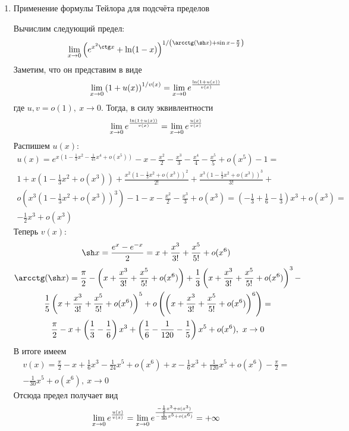 \begin{enumerate}
	\item Применение формулы Тейлора для подсчёта пределов
	\begin{example}
		Вычислим следующий предел:
		\[
			\liml_{x \to 0} \left(e^{x^2 \ctg x} + \ln(1 - x)\right)^{1 / \left(\arcctg (\sh x) + \sin x - \frac{\pi}{2}\right)}
		\]
		Заметим, что он представим в виде
		\[
			\lim\limits_{x \to 0} \left(1 + u(x)\right)^{1 / v(x)} = \lim\limits_{x \to 0} e^{ \frac{\ln (1 + u(x))}{v(x)}}
		\]
		где $u, v = o(1),\ x \to 0$. Тогда, в силу эквивлентности
		\[
			\lim\limits_{x \to 0} e^{ \frac{\ln (1 + u(x))}{v(x)}} = \lim\limits_{x \to 0} e^{\frac{u(x)}{v(x)}}
		\]
		Распишем $u(x)$:
		\begin{multline*}
			u(x) = e^{x\left(1 - \frac{1}{3}x^2 - \frac{1}{45}x^4 + o(x^5)\right)} - x - \frac{x^2}{2} - \frac{x^3}{3} - \frac{x^4}{4} - \frac{x^5}{5} + o(x^5) - 1 =
			\\
			1 + x\left(1 - \frac{1}{3}x^2 + o(x^3)\right) + \frac{x^2\left(1 - \frac{1}{3}x^2 + o(x^3)\right)^2}{2!} + \frac{x^3\left(1 - \frac{1}{3}x^2 + o(x^3)\right)^3}{3!} + 
			\\
			o\left(x^3\left(1 - \frac{1}{3}x^2 + o(x^3)\right)^3\right) - 1 - x - \frac{x^2}{2} - \frac{x^3}{3} + o(x^3) = \left(-\frac{1}{3} + \frac{1}{6} - \frac{1}{3}\right)x^3 + o(x^3) = 
			\\
			-\frac{1}{2}x^3 + o(x^3)
		\end{multline*}
		Теперь $v(x)$:
		\[
			\sh x = \frac{e^x - e^{-x}}{2} = x + \frac{x^3}{3!} + \frac{x^5}{5!} + o(x^6)
		\]
		\begin{multline*}
			\arcctg(\sh x) = \frac{\pi}{2} - \left(x + \frac{x^3}{3!} + \frac{x^5}{5!} + o(x^6)\right) + \frac{1}{3}\left(x + \frac{x^3}{3!} + \frac{x^5}{5!} + o(x^6)\right)^3 -
			\\
			\frac{1}{5}\left(x + \frac{x^3}{3!} + \frac{x^5}{5!} + o(x^6)\right)^5 + o\left(\left(x + \frac{x^3}{3!} + \frac{x^5}{5!} + o(x^6)\right)^6\right) =
			\\
			\frac{\pi}{2} - x + \left(\frac{1}{3} - \frac{1}{6}\right)x^3 + \left(\frac{1}{6} - \frac{1}{120} - \frac{1}{5}\right)x^5 + o(x^6),\ x \to 0
		\end{multline*}
		В итоге имеем
		\begin{multline*}
			v(x) = \frac{\pi}{2} - x + \frac{1}{6}x^3 - \frac{1}{24}x^5 + o(x^6) + x - \frac{1}{6}x^3 + \frac{1}{120}x^5 + o(x^6) - \frac{\pi}{2} =
			\\
			-\frac{1}{30}x^5 + o(x^6),\ x \to 0
		\end{multline*}
		Отсюда предел получает вид
		\[
			\lim\limits_{x \to 0} e^{\frac{u(x)}{v(x)}} = \lim\limits_{x \to 0} e^{\frac{-\frac{1}{2}x^3 + o(x^3)}{-\frac{1}{30}x^5 + o(x^6)}} = +\infty
		\]
	\end{example}
\end{enumerate}

